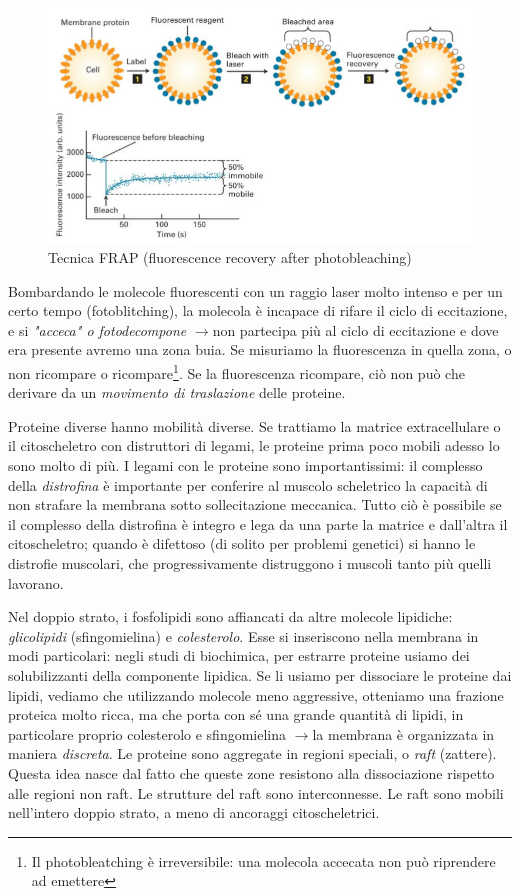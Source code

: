 \documentclass[a4paper,12pt]{article}
\newcommand{\lfreccia}{\ensuremath{\longrightarrow}}
\begin{document}
\begin{figure}[H]
\centering
\includegraphics[scale=0.4]{immagine/frap.jpg}
\caption{Tecnica FRAP (fluorescence recovery after photobleaching)}
\end{figure}

Bombardando le molecole fluorescenti con un raggio laser molto intenso e per un certo tempo (fotoblitching), la molecola è incapace di rifare il ciclo di eccitazione, e si \emph{"acceca" o fotodecompone} \lfreccia non partecipa più al ciclo di eccitazione e dove era presente avremo una zona buia. Se misuriamo la fluorescenza in quella zona, o non ricompare o ricompare\footnote{Il photobleatching è irreversibile: una molecola accecata non può riprendere ad emettere}. Se la fluorescenza ricompare, ciò non può che derivare da un \emph{movimento di traslazione} delle proteine.

Proteine diverse hanno mobilità diverse. Se trattiamo la matrice extracellulare o il citoscheletro con distruttori di legami, le proteine prima poco  mobili adesso lo sono molto di più. I legami con le proteine sono importantissimi: il complesso della \emph{distrofina} è importante per conferire al muscolo scheletrico la capacità di non strafare la membrana sotto sollecitazione meccanica. Tutto ciò è possibile se il complesso della distrofina è integro e lega da una parte la matrice e dall'altra il citoscheletro; quando è difettoso (di solito per problemi genetici) si hanno le distrofie muscolari, che progressivamente distruggono i muscoli tanto più quelli lavorano.

Nel doppio strato, i fosfolipidi sono affiancati da altre molecole lipidiche: \emph{glicolipidi} (sfingomielina) e \emph{colesterolo}. Esse si inseriscono nella membrana in modi particolari: negli studi di biochimica, per estrarre proteine usiamo dei solubilizzanti della componente lipidica. Se li usiamo per dissociare le proteine dai lipidi, vediamo che utilizzando molecole meno aggressive, otteniamo una frazione proteica molto ricca, ma che porta con sé una grande quantità di lipidi, in particolare proprio colesterolo e sfingomielina \lfreccia la  membrana è organizzata in maniera \emph{discreta}. Le proteine sono aggregate in regioni speciali, o \emph{raft} (zattere). Questa idea nasce dal fatto che queste zone resistono alla dissociazione rispetto alle regioni non raft. Le strutture del raft sono interconnesse. Le raft sono mobili nell'intero doppio strato, a meno di ancoraggi citoscheletrici.
\end{document}
